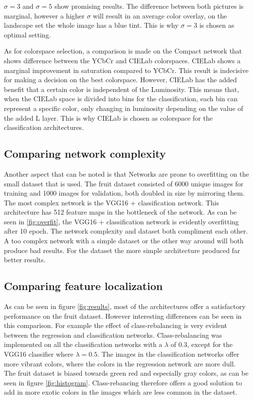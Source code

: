 $\sigma = 3$ and $\sigma = 5$ show promising results. The difference between both pictures is marginal, however a higher $\sigma$ will result in an average color overlay, on the landscape set the whole image has a blue tint. This is why $\sigma = 3$ is chosen as optimal setting.


As for colorspace selection, a comparison is made on the Compact network that shows difference between the YCbCr and CIELab colorspaces. CIELab shows a marginal improvement in saturation compared to YCbCr. This result is indecisive for making a decision on the best colorspace. However, CIELab has the added benefit that a certain color is independent of the Luminosity. This means that, when the CIELab space is divided into bins for the classification, each bin can represent a specific color, only changing in luminosity depending on the value of the added L layer. This is why CIELab is chosen as colorspace for the classification architectures.


\subsection{Comparing network complexity}

Another aspect that can be noted is that Networks are prone to overfitting on the small dataset that is used. The fruit dataset consisted of 6000 unique images for training and 1000 images for validation, both doubled in size by mirroring them. The most complex network is the VGG16 + classification network. This architecture has 512 feature maps in the bottleneck of the network. As can be seen in \ref{fig:overfit}, the VGG16 + classification network is evidently overfitting after 10 epoch. The network complexity and dataset both compliment each other. A too complex network with a simple dataset or the other way around will both produce bad results. For the dataset the more simple architecture produced far better results.

\subsection{Comparing feature localization}
As can be seen in figure \ref{fig:results}, most of the architectures offer a satisfactory performance on the fruit dataset. However interesting differences can be seen in this comparison. For example the effect of class-rebalancing is very evident between the regression and classification networks. Class-rebalancing was implemented on all the classification networks with a $\lambda$ of 0.3, except for the VGG16 classifier where $\lambda = 0.5$. The images in the classification networks offer more vibrant colors, where the colors in the regression network are more dull. The fruit dataset is biased towards green red and especially gray colors, as can be seen in figure \ref{fig:histogram}. Class-rebancing therefore offers a good solution to add in more exotic colors in the images which are less common in the dataset.

